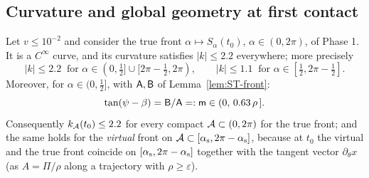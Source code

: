 \subsection{Curvature and global geometry at first contact}

\begin{lemma}\label{lem:ST-D1}
Let $v\le10^{-2}$ and consider the true front $\alpha\mapsto S_\alpha(t_0)$, $\alpha\in(0,2\pi)$, of Phase 1. It is a $C^\infty$ curve,
and its curvature satisfies $|k|\le2.2$ everywhere; more precisely
\[
|k|\le2.2\ \text{ for }\alpha\in(0,\tfrac12]\cup[2\pi-\tfrac12,2\pi),\qquad|k|\le1.1\ \text{ for }\alpha\in[\tfrac12,2\pi-\tfrac12].
\]
Moreover, for $\alpha\in(0,\frac12]$, with $\mathsf A,\mathsf B$ of Lemma~\ref{lem:ST-front}:
\[
\tan(\psi-\beta)=\mathsf B/\mathsf A=:\mathsf m\in(0,\,0.63\,\rho\,].
\]
Consequently $k_{\mathcal A}(t_0)\le2.2$ for every compact $\mathcal A\subset(0,2\pi)$ for the true front; and the same holds for the
\emph{virtual} front on $\mathcal A\subset[\alpha_{\mathrm s},2\pi-\alpha_{\mathrm s}]$, because at $t_0$ the virtual and the true front coincide on
$[\alpha_{\mathrm s},2\pi-\alpha_{\mathrm s}]$ together with the tangent vector $\partial_\theta x$ (as $A=\Pi/\rho$ along a trajectory with
$\rho\ge\varepsilon$).
\end{lemma}
